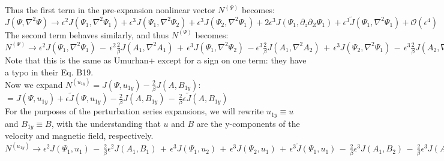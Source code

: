 \documentclass[letterpaper,12pt]{article}
\begin{document}
Thus the first term in the pre-expansion nonlinear vector $N^{(\Psi)}$ becomes: \\

$J(\Psi, \nabla^2\Psi) \to \epsilon^2 J(\Psi_1, \nabla^2 \Psi_1) + \epsilon^3 J(\Psi_1, \nabla^2\Psi_2) + \epsilon^3 J(\Psi_2, \nabla^2\Psi_1) + 2\epsilon^3 J(\Psi_1, \partial_z\partial_Z \Psi_1) + \epsilon^3\widetilde{J}(\Psi_1, \nabla^2 \Psi_1) + \mathcal{O}(\epsilon^4)$ \\

The second term behaves similarly, and thus $N^{(\Psi)}$ becomes: \\

$N^{(\Psi)} \to \epsilon^2 J(\Psi_1, \nabla^2 \Psi_1) \,-\, \epsilon^2 \frac{2}{\beta}J(A_1, \nabla^2 A_1) \,+\, \epsilon^3 J(\Psi_1, \nabla^2\Psi_2) \, - \epsilon^3\frac{2}{\beta}J(A_1, \nabla^2 A_2) \,+\, \epsilon^3 J(\Psi_2, \nabla^2\Psi_1) \, - \, \epsilon^3 \frac{2}{\beta}J(A_2, \nabla^2 A_1) \,+\, 2\epsilon^3 J(\Psi_1, \partial_z\partial_Z \Psi_1) \, - \, 2\epsilon^3 \frac{2}{\beta}J(A_1, \partial_z\partial_Z A_1) \,+\, \epsilon^3\widetilde{J}(\Psi_1, \nabla^2 \Psi_1) \, - \, \epsilon^3 \frac{2}{\beta}\widetilde{J}(A_1, \nabla^2 A_1) \, + \, \mathcal{O}(\epsilon^4)$ \\

Note that this is the same as Umurhan+ except for a sign on one term: they have a typo in their Eq. B19. \\

Now we expand $N^{(u_{1y})} = J(\Psi, u_{1y}) - \frac{2}{\beta} J(A, B_{1y})$: \\

$= J(\Psi, u_{1y}) + \epsilon \widetilde{J}(\Psi, u_{1y}) - \frac{2}{\beta}J(A, B_{1y}) \, - \, \frac{2}{\beta}\epsilon \widetilde{J}(A, B_{1y})$ \\

For the purposes of the perturbation series expansions, we will rewrite $u_{1y} \equiv u$ and $B_{1y} \equiv B$, with the understanding that $u$ and $B$ are the y-components of the velocity and magnetic field, respectively. \\

$N^{(u_{1y})} \to \epsilon^2 J(\Psi_1, u_1) \, - \, \frac{2}{\beta} \epsilon^2 J(A_1, B_1) \, + \, \epsilon^3 J(\Psi_1, u_2) \, + \, \epsilon^3 J(\Psi_2, u_1) \, + \, \epsilon^3 \widetilde{J}(\Psi_1, u_1) \, - \, \frac{2}{\beta} \epsilon^3 J(A_1, B_2) \, - \, \frac{2}{\beta} \epsilon^3 J(A_2, B_1) \, - \, \frac{2}{\beta}\epsilon^3 \widetilde{J}(A_1, B_1) \, + \, \mathcal{O}(\epsilon^4)$ \\
\end{document}
